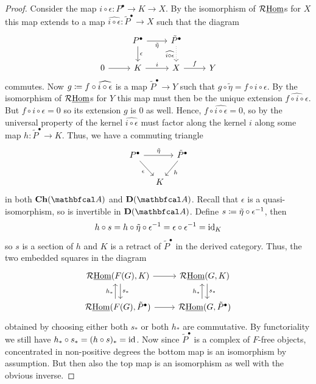 \begin{proof}
	Consider the map $i\circ\epsilon \colon P^\bullet\to K \to X$. By the isomorphism of $\mathcal{R}{\underline{\operatorname{Hom}}}$s for $X$ this map extends to a map $\widehat{i\circ\epsilon}\colon \tilde P^\bullet \to X$ such that the diagram
	$$\begin{tikzcd}
		&P^\bullet\ar[d, "\epsilon"]\ar[r, "\tilde\eta", swap] &\tilde P^\bullet\ar[d, "\widehat{i\circ \epsilon}", dotted, swap]\\
		0\ar[r]&K\ar[r, "i"] &X \ar[r, "f"] &Y
	\end{tikzcd}$$
	commutes. Now $g\coloneqq f\circ \widehat{i\circ \epsilon}$ is a map $\tilde P^\bullet\to Y$ such that $g\circ \tilde\eta = f\circ i\circ \epsilon$. By the isomorphism of $\mathcal{R}{\underline{\operatorname{Hom}}}$s for $Y$ this map must then be the unique extension $\widehat{f\circ i \circ \epsilon}$. But $f\circ i\circ\epsilon = 0$ so its extension $g$ is $0$ as well. Hence, $f\circ \widehat{i\circ \epsilon} = 0$, so by the universal property of the kernel $\widehat{i\circ \epsilon}$ must factor along the kernel $i$ along some map $h\colon \tilde P^\bullet\to K$. Thus, we have a commuting triangle
	$$\begin{tikzcd}[column sep=1em]
		P^\bullet\ar[rr, "\tilde\eta"]\ar[dr, "\epsilon", swap] &&[-.3em] \tilde P^\bullet\ar[dl, "h"]\\
		&K
	\end{tikzcd}$$
	in both $\complexes{\category A}$ and $\derived{\category{A}}$. Recall that $\epsilon$ is a quasi-isomorphism, so is invertible in $\derived{\category{A}}$. Define $s\coloneqq \tilde\eta\circ\epsilon^{-1}$, then
	$$h\circ s = h\circ \tilde\eta\circ \epsilon^{-1} = \epsilon\circ\epsilon^{-1}=\mathrm{id}_K$$
	so $s$ is a section of $h$ and $K$ is a retract of $\tilde P^\bullet$ in the derived category. Thus, the two embedded squares in the diagram
	$$\begin{tikzcd}
		\eRHom(F(G), K)\ar[r]\ar[d, "s_\ast", shift left=3pt] &\eRHom(G, K)\ar[d, shift left=3pt, "s_\ast"]\\
		\eRHom(F(G), \tilde P^\bullet)\ar[r]\ar[u, "h_\ast", shift left=3pt] &\eRHom(G, \tilde P^\bullet)\ar[u, "h_\ast", shift left=3pt]
	\end{tikzcd}$$
	obtained by choosing either both $s_\ast$ or both $h_\ast$ are commutative. By functoriality we still have $h_\ast\circ s_\ast = (h\circ s)_\ast = \mathrm{id}$. Now since $\tilde P^\bullet$ is a complex of $F$-free objects, concentrated in non-positive degrees the bottom map is an isomorphism by assumption. But then also the top map is an isomorphism as well with the obvious inverse.
\end{proof}

